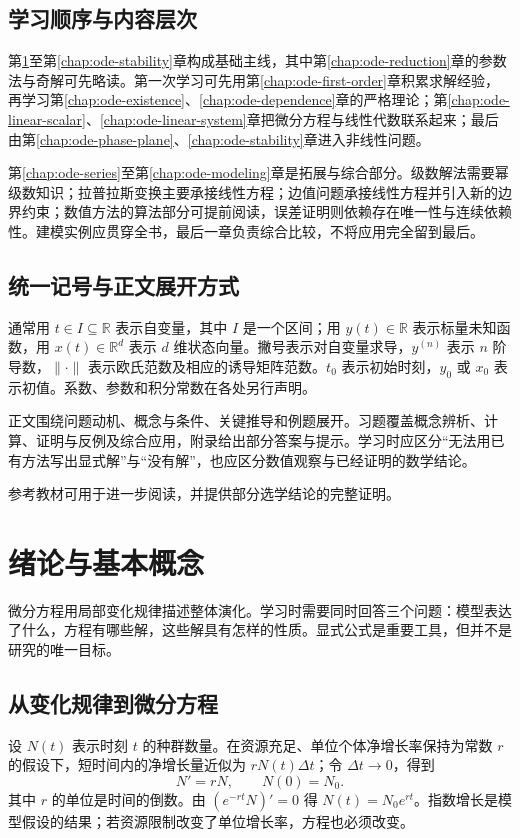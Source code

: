 \documentclass[UTF8,12pt,a4paper,fontset=fandol]{ctexbook}
\begin{document}
\section*{学习顺序与内容层次}
第\ref{chap:ode-intro}至第\ref{chap:ode-stability}章构成基础主线，其中第\ref{chap:ode-reduction}章的参数法与奇解可先略读。第一次学习可先用第\ref{chap:ode-first-order}章积累求解经验，再学习第\ref{chap:ode-existence}、\ref{chap:ode-dependence}章的严格理论；第\ref{chap:ode-linear-scalar}、\ref{chap:ode-linear-system}章把微分方程与线性代数联系起来；最后由第\ref{chap:ode-phase-plane}、\ref{chap:ode-stability}章进入非线性问题。

第\ref{chap:ode-series}至第\ref{chap:ode-modeling}章是拓展与综合部分。级数解法需要幂级数知识；拉普拉斯变换主要承接线性方程；边值问题承接线性方程并引入新的边界约束；数值方法的算法部分可提前阅读，误差证明则依赖存在唯一性与连续依赖性。建模实例应贯穿全书，最后一章负责综合比较，不将应用完全留到最后。

\section*{统一记号与正文展开方式}
通常用 $t\in I\subseteq\mathbb{R}$ 表示自变量，其中 $I$ 是一个区间；用 $y(t)\in\mathbb{R}$ 表示标量未知函数，用 $x(t)\in\mathbb{R}^d$ 表示 $d$ 维状态向量。撇号表示对自变量求导，$y^{(n)}$ 表示 $n$ 阶导数，$\|\cdot\|$ 表示欧氏范数及相应的诱导矩阵范数。$t_0$ 表示初始时刻，$y_0$ 或 $x_0$ 表示初值。系数、参数和积分常数在各处另行声明。

正文围绕问题动机、概念与条件、关键推导和例题展开。习题覆盖概念辨析、计算、证明与反例及综合应用，附录给出部分答案与提示。学习时应区分“无法用已有方法写出显式解”与“没有解”，也应区分数值观察与已经证明的数学结论。

参考教材\cite{lebl-diffyqs,teschl-ode}可用于进一步阅读，并提供部分选学结论的完整证明。

\mainmatter

\chapter{绪论与基本概念}
\label{chap:ode-intro}

微分方程用局部变化规律描述整体演化。学习时需要同时回答三个问题：模型表达了什么，方程有哪些解，这些解具有怎样的性质。显式公式是重要工具，但并不是研究的唯一目标。

\section{从变化规律到微分方程}
设 $N(t)$ 表示时刻 $t$ 的种群数量。在资源充足、单位个体净增长率保持为常数 $r$ 的假设下，短时间内的净增长量近似为 $rN(t)\Delta t$；令 $\Delta t\to0$，得到
\[
  N'=rN,\qquad N(0)=N_0.
\]
其中 $r$ 的单位是时间的倒数。由 $(e^{-rt}N)'=0$ 得 $N(t)=N_0e^{rt}$。指数增长是模型假设的结果；若资源限制改变了单位增长率，方程也必须改变。
\end{document}
